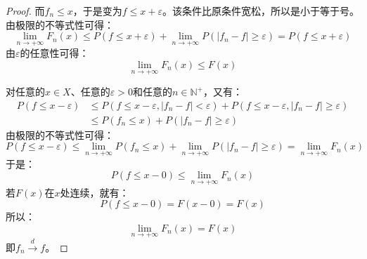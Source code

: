 \begin{proof}
	而$f_n\leqslant x$，于是变为$f\leqslant x+\varepsilon$。该条件比原条件宽松，所以是小于等于号。由极限的不等式性可得：
	\begin{equation*}
		\lim_{n\to+\infty}F_n(x)\leqslant P(f\leqslant x+\varepsilon)+\lim_{n\to+\infty}P(|f_n-f|\geqslant\varepsilon)=P(f\leqslant x+\varepsilon)
	\end{equation*}
	由$\varepsilon$的任意性可得：
	\begin{equation*}
		\lim_{n\to+\infty}F_n(x)\leqslant F(x)
	\end{equation*}\par
	对任意的$x\in X$、任意的$\varepsilon>0$和任意的$n\in \mathbb{N}^+$，又有：
	\begin{align*}
		P(f\leqslant x-\varepsilon)&\leqslant P(f\leqslant x-\varepsilon,|f_n-f|<\varepsilon)+P(f\leqslant x-\varepsilon,|f_n-f|\geqslant \varepsilon) \\
		&\leqslant P(f_n\leqslant x)+P(|f_n-f|\geqslant\varepsilon)
	\end{align*}
	由极限的不等式性可得：
	\begin{equation*}
		P(f\leqslant x-\varepsilon)\leqslant\lim_{n\to+\infty}P(f_n\leqslant x)+\lim_{n\to+\infty}P(|f_n-f|\geqslant\varepsilon)=\lim_{n\to+\infty}F_n(x)
	\end{equation*}
	于是：
	\begin{equation*}
		P(f\leqslant x-0)\leqslant\lim_{n\to+\infty}F_n(x)
	\end{equation*}
	若$F(x)$在$x$处连续，就有：
	\begin{equation*}
		P(f\leqslant x-0)=F(x-0)=F(x)
	\end{equation*}
	所以：
	\begin{equation}
		\lim_{n\to+\infty}F_n(x)=F(x)
	\end{equation}
	即$f_n\overset{d}{\longrightarrow}f$。
\end{proof}
